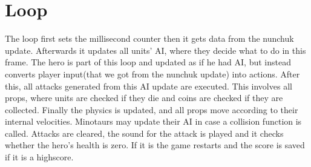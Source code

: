 \section{Loop} %
The loop first sets the millisecond counter then it gets data from the nunchuk update. Afterwards it updates all units' AI, where they decide what to do in this frame. The hero is part of this loop and updated as if he had AI, but instead converts player input(that we got from the nunchuk update) into actions. After this, all attacks generated from this AI update are executed. This involves all props, where units are checked if they die and coins are checked if they are collected. Finally the physics is updated, and all props move according to their internal velocities. Minotaurs may update their AI in case a collision function is called.
\newline
Attacks are cleared, the sound for the attack is played and it checks whether the hero's health is zero. If it is the game restarts and the score is saved if it is a highscore.

